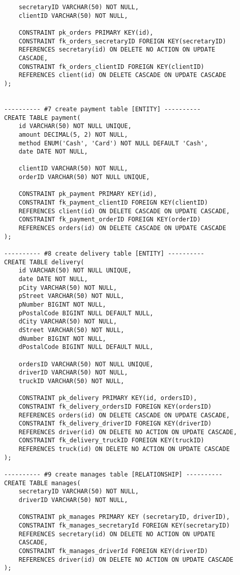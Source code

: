\begin{lstlisting}
    secretaryID VARCHAR(50) NOT NULL,
    clientID VARCHAR(50) NOT NULL,
    
    CONSTRAINT pk_orders PRIMARY KEY(id),
    CONSTRAINT fk_orders_secretaryID FOREIGN KEY(secretaryID)  
    REFERENCES secretary(id) ON DELETE NO ACTION ON UPDATE 
    CASCADE,
    CONSTRAINT fk_orders_clientID FOREIGN KEY(clientID)  
    REFERENCES client(id) ON DELETE CASCADE ON UPDATE CASCADE
);


---------- #7 create payment table [ENTITY] ----------
CREATE TABLE payment(
    id VARCHAR(50) NOT NULL UNIQUE,
    amount DECIMAL(5, 2) NOT NULL,
    method ENUM('Cash', 'Card') NOT NULL DEFAULT 'Cash',
    date DATE NOT NULL,
    
    clientID VARCHAR(50) NOT NULL,
    orderID VARCHAR(50) NOT NULL UNIQUE,
     
    CONSTRAINT pk_payment PRIMARY KEY(id),
    CONSTRAINT fk_payment_clientID FOREIGN KEY(clientID) 
    REFERENCES client(id) ON DELETE CASCADE ON UPDATE CASCADE, 
    CONSTRAINT fk_payment_orderID FOREIGN KEY(orderID) 
    REFERENCES orders(id) ON DELETE CASCADE ON UPDATE CASCADE
);

---------- #8 create delivery table [ENTITY] ----------
CREATE TABLE delivery(
    id VARCHAR(50) NOT NULL UNIQUE,
    date DATE NOT NULL,
    pCity VARCHAR(50) NOT NULL,
    pStreet VARCHAR(50) NOT NULL,
    pNumber BIGINT NOT NULL,
    pPostalCode BIGINT NULL DEFAULT NULL,
    dCity VARCHAR(50) NOT NULL,
    dStreet VARCHAR(50) NOT NULL,
    dNumber BIGINT NOT NULL,
    dPostalCode BIGINT NULL DEFAULT NULL,

    ordersID VARCHAR(50) NOT NULL UNIQUE,
    driverID VARCHAR(50) NOT NULL,
    truckID VARCHAR(50) NOT NULL,
    
    CONSTRAINT pk_delivery PRIMARY KEY(id, ordersID),
    CONSTRAINT fk_delivery_ordersID FOREIGN KEY(ordersID) 
    REFERENCES orders(id) ON DELETE CASCADE ON UPDATE CASCADE,
    CONSTRAINT fk_delivery_driverID FOREIGN KEY(driverID) 
    REFERENCES driver(id) ON DELETE NO ACTION ON UPDATE CASCADE,
    CONSTRAINT fk_delivery_truckID FOREIGN KEY(truckID) 
    REFERENCES truck(id) ON DELETE NO ACTION ON UPDATE CASCADE
);

---------- #9 create manages table [RELATIONSHIP] ----------
CREATE TABLE manages(
    secretaryID VARCHAR(50) NOT NULL,
    driverID VARCHAR(50) NOT NULL,
    
    CONSTRAINT pk_manages PRIMARY KEY (secretaryID, driverID),
    CONSTRAINT fk_manages_secretaryId FOREIGN KEY(secretaryID) 
    REFERENCES secretary(id) ON DELETE NO ACTION ON UPDATE 
    CASCADE,
    CONSTRAINT fk_manages_driverId FOREIGN KEY(driverID) 
    REFERENCES driver(id) ON DELETE NO ACTION ON UPDATE CASCADE
);


\end{lstlisting}
